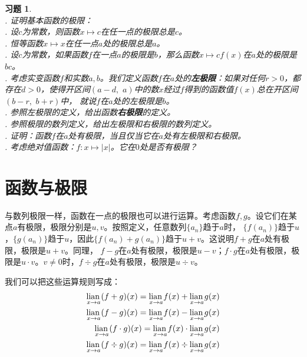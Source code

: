 \documentclass[12pt,UTF8]{ctexbook}
\newcommand\lian[1]{
    \underset{#1}{\operatorname{lian}\,}
}
\newtheorem{xt}{习题}[section]
\begin{document}
\begin{xt}
    \mbox{} \\
    . 证明基本函数的极限：\\
    . 设$c$为常数，则函数$x\mapsto c$在任一点的极限总是$c$。\\
    . 恒等函数$x\mapsto x$在任一点$a$处的极限总是$a$。\\
    . 设$c$为常数，如果函数$f$在一点$a$的极限是$b$，那么函数$x\mapsto cf(x)$在$a$处的极限是$bc$。\\
    . 考虑实变函数$f$和实数$a, b$。我们定义函数$f$在$a$处的\textbf{左极限}：如果对任何$r>0$，都存在$d>0$，使得开区间$(a-d,\,\,a)$中的数$x$经过$f$得到的函数值$f(x)$总在开区间$(b-r,\,\,b+r)$中，
    就说$f$在$a$处的左极限是$b$。\\
    . 参照左极限的定义，给出函数\textbf{右极限}的定义。\\
    . 参照极限的数列定义，给出左极限和右极限的数列定义。\\
    . 证明：函数$f$在$a$处有极限，当且仅当它在$a$处有左极限和右极限。\\
    . 考虑绝对值函数：$f:x\mapsto |x|$。它在$0$处是否有极限？
\end{xt}

\section{函数与极限}
与数列极限一样，函数在一点的极限也可以进行运算。考虑函数$f,g$。设它们在某点$a$有极限，极限分别是$u, v$。按照定义，任意数列$\{a_n\}$趋于$a$时，
$\{f(a_n)\}$趋于$u$，$\{g(a_n)\}$趋于$u$，因此$\{f(a_n) + g(a_n)\}$趋于$u + v$。这说明$f + g$在$a$处有极限，极限是$u + v$。同理，
$f - g$在$a$处有极限，极限是$u - v$；$f \cdot g$在$a$处有极限，极限是$u \cdot v$。$v\neq 0$时，$f\div g$在$a$处有极限，极限是$u \div v$。

我们可以把这些运算规则写成：
\begin{align}
    \lian{x \to a} (f + g)(x) = \lian{x \to a} f(x) + \lian{x \to a} g(x) \notag \\
    \lian{x \to a} (f - g)(x) = \lian{x \to a} f(x) - \lian{x \to a} g(x) \notag \\
    \lian{x \to a} (f \cdot g)(x) = \lian{x \to a} f(x) \cdot \lian{x \to a} g(x) \notag \\
    \lian{x \to a} (f \div g)(x) = \lian{x \to a} f(x) \div \lian{x \to a} g(x) \notag
\end{align}
\end{document}
